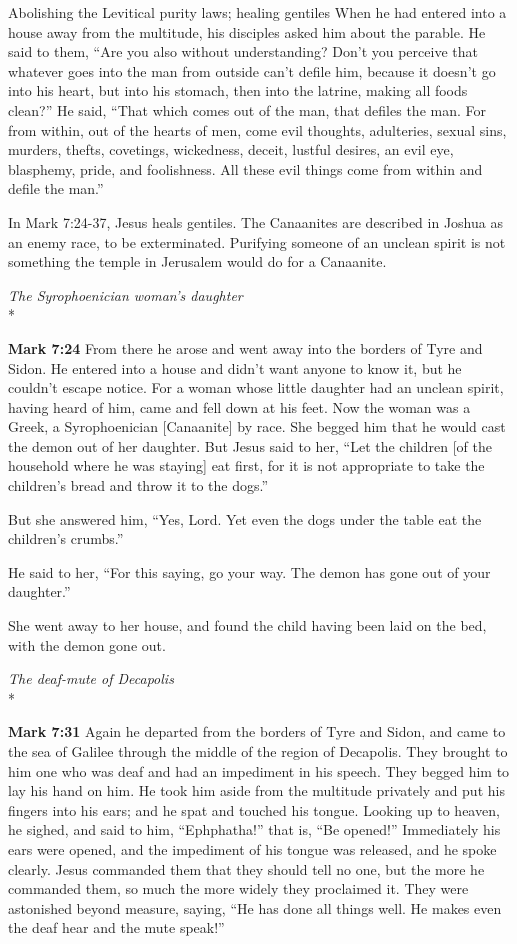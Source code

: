 \documentclass[10pt,twoside]{article} %
\newcommand{\quotesize}{\normalsize{}}
\newcommand{\comm}[1]{\begingroup \color{black!50} #1\endgroup}
\newenvironment{quotetext}{\begingroup\quotesize}{\endgroup}
\newcommand{\intex}[1]{\index[texts]{#1}}
\newcommand{\bible}[2]{\begin{quotetext}\textbf{#1}\intex{#1} #2\end{quotetext}}
\newcommand{\gospelmark}[2]{\bible{Mark #1}{#2}}
\newcommand{\subhead}[1]{\emph{#1}\\*}
\begin{document}
\begin{section}{Abolishing the Levitical purity laws; healing gentiles}
{  When he had entered into a house away from the multitude, his disciples asked him about the parable.   He said to them, ``Are you also without understanding? Don't you perceive that whatever goes into the man from outside can't defile him,    because it doesn't go into his heart, but into his stomach, then into the latrine, making all foods clean?''   He said, ``That which comes out of the man, that defiles the man.    For from within, out of the hearts of men, come evil thoughts, adulteries, sexual sins, murders, thefts,    covetings, wickedness, deceit, lustful desires, an evil eye, blasphemy, pride, and foolishness.    All these evil things come from within and defile the man.''
}

\comm{
In Mark 7:24-37, Jesus heals gentiles. The Canaanites are described in Joshua as an enemy race, to be exterminated. Purifying someone
of an unclean spirit is not something the temple in Jerusalem would do for a Canaanite.
}

\subhead{The Syrophoenician woman's daughter}

\gospelmark{7:24}{
  From there he arose and went away into the borders of Tyre and Sidon. He entered into a house and didn't want anyone to know it, but he couldn't escape notice.   For a woman whose little daughter had an unclean spirit, having heard of him, came and fell down at his feet.   Now the woman was a Greek, a Syrophoenician [Canaanite] by race. She begged him that he would cast the demon out of her daughter.   But Jesus said to her, ``Let the children
[of the household where he was staying] eat first, for it is not appropriate to take the children's bread and throw it to the dogs.''


  But she answered him, ``Yes, Lord. Yet even the dogs under the table eat the children's crumbs.''

  He said to her, ``For this saying, go your way. The demon has gone out of your daughter.''

  She went away to her house, and found the child having been laid on the bed, with the demon gone out.
}

\subhead{The deaf-mute of Decapolis}

\gospelmark{7:31}{
  Again he departed from the borders of Tyre and Sidon, and came to the sea of Galilee through the middle of the region of Decapolis.   They brought to him one who was deaf and had an impediment in his speech. They begged him to lay his hand on him.   He took him aside from the multitude privately and put his fingers into his ears; and he spat and touched his tongue.   Looking up to heaven, he sighed, and said to him, ``Ephphatha!'' that is, ``Be opened!''   Immediately his ears were opened, and the impediment of his tongue was released, and he spoke clearly.   Jesus commanded them that they should tell no one, but the more he commanded them, so much the more widely they proclaimed it.   They were astonished beyond measure, saying, ``He has done all things well. He makes even the deaf hear and the mute speak!''
}



\end{section}
\end{document}
